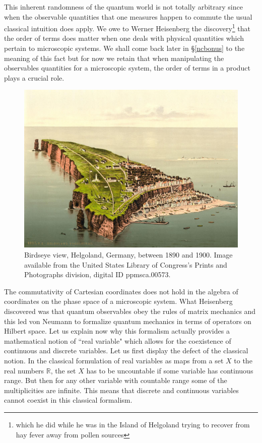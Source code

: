 \documentclass[12pt]{article}
\def\R{{\mathbb R}}
\begin{document}
This inherent randomness of the quantum world is not totally arbitrary since when the observable quantities that one measures happen to commute the usual classical intuition does apply. 
We owe to Werner Heisenberg the discovery\footnote{which he did while he was in the Island of Helgoland trying to recover from hay fever away from pollen sources} that the order of terms does matter when one deals with physical quantities which pertain to microscopic systems. We shall come back later in \S \ref{ncbonus} to the meaning of this fact but for now we retain that  
when manipulating the observables quantities for a microscopic system, the order of terms in a product plays a crucial role.  
\begin{figure}[H]
\begin{center}
\includegraphics[scale=0.2]{heligoland1.jpeg}
\end{center}
\caption{Birdseye view, Helgoland, Germany, between 1890 and 1900. Image available from the United States Library of Congress's Prints and Photographs division, digital ID ppmsca.00573. \label{helgoland} }
\end{figure}
The commutativity of Cartesian coordinates does not hold in the algebra of coordinates on the phase space of a microscopic system. 
What Heisenberg discovered was that quantum observables obey the rules of matrix mechanics and  this led von Neumann to formalize quantum mechanics in terms of operators on Hilbert space. Let us explain now why this formalism actually provides a mathematical notion of ``real variable" which allows for the coexistence of continuous and discrete variables. Let us first display the defect of the classical notion.
In the classical formulation of real variables as maps from a set $X$ to the real numbers $\R$, the set $X$ has to be uncountable if some variable has continuous range. But then for any other variable with countable range some of the multiplicities are infinite. This means that discrete and continuous variables cannot coexist in this classical formalism. 
\end{document}
